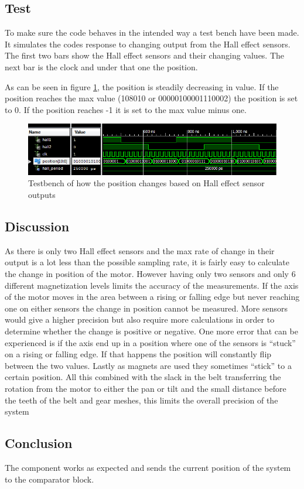 \subsection{Test}
To make sure the code behaves in the intended way a test bench have been made. It simulates the codes response to changing output from the Hall effect sensors. The first two bars show the Hall effect sensors and their changing values. The next bar is the clock and under that one the position.

As can be seen in figure \ref{fig:Pos_change_testbench}, the position is steadily decreasing in value.
If the position reaches the max value (108010 or 00000100001110002) the position is set to 0. If the position reaches -1 it is set to the max value minus one.

\begin{figure}[h!]
\centering
\includegraphics[scale=0.8]{Billeder/FPGA/Pos_change_testbench.png}
\caption{ Testbench of how the position changes based on Hall effect sensor outputs }
\label{fig:Pos_change_testbench}
\end{figure}

\subsection{Discussion}
As there is only two Hall effect sensors and the max rate of change in their output is a lot less than the possible sampling rate, it is fairly easy to calculate the change in position of the motor. However having only two sensors and only 6 different magnetization levels limits the accuracy of the measurements. If the axis of the motor moves in the area between a rising or falling edge but never reaching one on either sensors the change in position cannot be measured. More sensors would give a higher precision but also require more calculations in order to determine whether the change is positive or negative.
One more error that can be experienced is if the axis end up in a position where one of the sensors is “stuck” on a rising or falling edge. If that happens the position will constantly flip between the two values.
Lastly as magnets are used they sometimes “stick” to a certain position.
All this combined with the slack in the belt transferring the rotation from the motor to either the pan or tilt and the small distance before the teeth of the belt and gear meshes, this limits the overall precision of the system

\subsection{Conclusion}

The component works as expected and sends the current position of the system to the comparator block.